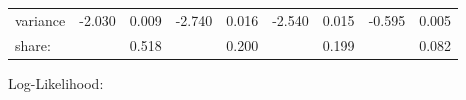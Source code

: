 \documentclass[12pt]{article}
\begin{document}
\begin{landscape}
\begin{table}
\begin{threeparttable}
{\begin{tabular}[l]{l r r r r r r r r}
variance         &   -2.030  &    0.009   &    -2.740  &    0.016   &    -2.540  &    0.015   &    -0.595  &    0.005  \\
\cmidrule(l){2-3}  \cmidrule(l){4-5}  \cmidrule(l){6-7}   \cmidrule(l){8-9}        
share:           &           &    0.518   &            &    0.200   &            &    0.199   &            &    0.082  \\ 
\cmidrule{1-9}     
      \end{tabular}
      }
      \begin{tablenotes}
        \item Log-Likelihood:

      \end{tablenotes} \label{tbl:4E_full_regressions_results}


    \end{threeparttable}

\end{table}




\end{landscape}
\end{document}
